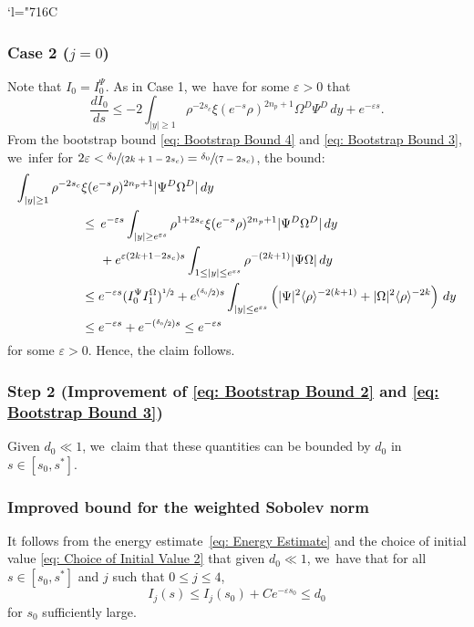 \documentclass[10pt]{amsart}
\newcommand{\Changelback}{\mathcode`l="716C}
\newcommand{\Psfrac}[2]{(\sfrac{#1}{#2})}
\newcommand{\spfrac}[2]{\sfrac{#1}{(#2)}}
\theoremstyle{plain}
\theoremstyle{definition}
\begin{document}
\Changelback

\subsubsection*{Case 2 ($j=0$)}
Note that $I_0=I_0^\Psi$. As in Case 1, we~have for some $\varepsilon>0$ that
\[
\frac{dI_0}{ds} \le -2\int_{|y|\ge 1} \rho^{-2s_c}\xi(e^{-s}\rho)^{2n_p+1}\Omega^D\Psi^D\,dy+e^{-\varepsilon s}.
\]
From the bootstrap bound \eqref{eq: Bootstrap Bound 4} and \eqref{eq: Bootstrap Bound 3}, we~infer for $2\varepsilon<\spfrac{\delta_0}{2k+1-2s_c}=\spfrac{\delta_0}{7-2s_c}$, the bound:
\[
\begin{aligned}
\int_{|y|\ge1} \rho^{-2s_c}&\xi(e^{-s}\rho)^{2n_p+1}|\Psi^D\Omega^D|\,dy\\
&\le \, e^{-\varepsilon s}\int_{|y|\ge e^{\varepsilon s}} \rho^{1+2s_c}\xi(e^{-s}\rho)^{2n_p+1}| \Psi^D \Omega^D|\,dy\\
&\hspace*{.5cm}+e^{\varepsilon(2k+1-2s_c)s}\int_{1\le|y|\le e^{\varepsilon s}} \rho^{-(2k+1)}|\Psi \Omega|\,dy\\
&\le e^{-\varepsilon s}(I_0^\Psi I_1^\Omega)^{\sfrac{1}{2}}+e^{\Psfrac{\delta_0}{2} s}\int_{|y|\le e^{\varepsilon s}}\left(| \Psi |^2\langle\rho\rangle^{-2(k+1)}+|\Omega |^2\langle\rho\rangle^{-2k}\right)\,dy\\
&\le e^{-\varepsilon s}+e^{-\Psfrac{\delta_0}{2}s}\le e^{-\varepsilon s}
\end{aligned}
\]
for some $\varepsilon>0$. Hence, the claim follows.

\subsubsection*{Step 2 (Improvement of \eqref{eq: Bootstrap Bound 2} and \eqref{eq: Bootstrap Bound 3})}
Given $d_0\ll 1$, we~claim that these quantities can be bounded by $d_0$ in $s\in [s_0,s^*]$.

\subsubsection*{Improved bound for the weighted Sobolev norm}
It follows from the energy estimate~\eqref{eq: Energy Estimate} and the choice of initial value \eqref{eq: Choice of Initial Value 2} that given $d_0\ll1$, we~have that for all $s\in [s_0,s^*]$ and $j$ such that $0\le j\le 4$,
\begin{equation}
\label{eq: Improved Bound 1}
I_j(s)\le I_j(s_0)+ Ce^{-\varepsilon s_0} \le d_0
\end{equation}
for $s_0$ sufficiently large.
\end{document}
